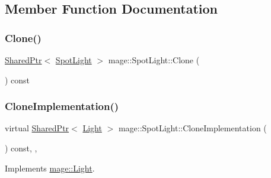 \subsection{Member Function Documentation}
\hypertarget{classmage_1_1_spot_light_aa2c787093d1fc29d79c11ecab40f33fd}{}\label{classmage_1_1_spot_light_aa2c787093d1fc29d79c11ecab40f33fd} 
\subsubsection{\texorpdfstring{Clone()}{Clone()}}
{\footnotesize\ttfamily \hyperlink{namespacemage_a1e01ae66713838a7a67d30e44c67703e}{Shared\+Ptr}$<$ \hyperlink{classmage_1_1_spot_light}{Spot\+Light} $>$ mage\+::\+Spot\+Light\+::\+Clone (\begin{DoxyParamCaption}{ }\end{DoxyParamCaption}) const}

\hypertarget{classmage_1_1_spot_light_a8329b021aeb7caeaa45f0bf06191ef9a}{}\label{classmage_1_1_spot_light_a8329b021aeb7caeaa45f0bf06191ef9a} 
\subsubsection{\texorpdfstring{Clone\+Implementation()}{CloneImplementation()}}
{\footnotesize\ttfamily virtual \hyperlink{namespacemage_a1e01ae66713838a7a67d30e44c67703e}{Shared\+Ptr}$<$ \hyperlink{classmage_1_1_light}{Light} $>$ mage\+::\+Spot\+Light\+::\+Clone\+Implementation (\begin{DoxyParamCaption}{ }\end{DoxyParamCaption}) const\hspace{0.3cm}{\ttfamily [override]}, {\ttfamily [private]}, {\ttfamily [virtual]}}



Implements \hyperlink{classmage_1_1_light_a53ef28bad86a1a307db90cb265db4798}{mage\+::\+Light}.

\hypertarget{classmage_1_1_spot_light_ac04202c48cb4c12334f9f55757a3d73a}{}\label{classmage_1_1_spot_light_ac04202c48cb4c12334f9f55757a3d73a} 
